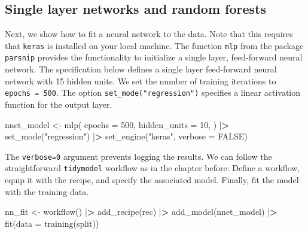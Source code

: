 \documentclass[
]{book}
\newenvironment{Shaded}{\begin{snugshade}}{\end{snugshade}}
\newcommand{\AttributeTok}[1]{\textcolor[rgb]{0.61,0.61,0.61}{#1}}
\newcommand{\ConstantTok}[1]{\textcolor[rgb]{0,0,0}{#1}}
\newcommand{\DecValTok}[1]{\textcolor[rgb]{0.06,0.06,0.06}{#1}}
\newcommand{\ErrorTok}[1]{\textcolor[rgb]{0.14,0.14,0.14}{\textbf{#1}}}
\newcommand{\FunctionTok}[1]{\textcolor[rgb]{0,0,0}{#1}}
\newcommand{\NormalTok}[1]{#1}
\newcommand{\OtherTok}[1]{\textcolor[rgb]{0.37,0.37,0.37}{#1}}
\newcommand{\SpecialCharTok}[1]{\textcolor[rgb]{0,0,0}{#1}}
\newcommand{\StringTok}[1]{\textcolor[rgb]{0.5,0.5,0.5}{#1}}
\begin{document}
\hypertarget{single-layer-networks-and-random-forests}{%
\subsection{Single layer networks and random forests}\label{single-layer-networks-and-random-forests}}

Next, we show how to fit a neural network to the data. Note that this requires that \texttt{keras} is installed on your local machine. The function \texttt{mlp} from the package \texttt{parsnip} provides the functionality to initialize a single layer, feed-forward neural network. The specification below defines a single layer feed-forward neural network with 15 hidden units. We set the number of training iterations to \texttt{epochs\ =\ 500}. The option \texttt{set\_mode("regression")} specifies a linear activation function for the output layer.

\begin{Shaded}
\begin{Highlighting}[]
\NormalTok{nnet\_model }\OtherTok{\textless{}{-}} \FunctionTok{mlp}\NormalTok{(}
  \AttributeTok{epochs =} \DecValTok{500}\NormalTok{,}
  \AttributeTok{hidden\_units =} \DecValTok{10}\NormalTok{,}
\NormalTok{) }\SpecialCharTok{|}\ErrorTok{\textgreater{}}
  \FunctionTok{set\_mode}\NormalTok{(}\StringTok{"regression"}\NormalTok{) }\SpecialCharTok{|}\ErrorTok{\textgreater{}}
  \FunctionTok{set\_engine}\NormalTok{(}\StringTok{"keras"}\NormalTok{, }\AttributeTok{verbose =} \ConstantTok{FALSE}\NormalTok{)}
\end{Highlighting}
\end{Shaded}

The \texttt{verbose=0} argument prevents logging the results. We can follow the straightforward \texttt{tidymodel} workflow as in the chapter before: Define a workflow, equip it with the recipe, and specify the associated model. Finally, fit the model with the training data.

\begin{Shaded}
\begin{Highlighting}[]
\NormalTok{nn\_fit }\OtherTok{\textless{}{-}} \FunctionTok{workflow}\NormalTok{() }\SpecialCharTok{|}\ErrorTok{\textgreater{}}
  \FunctionTok{add\_recipe}\NormalTok{(rec) }\SpecialCharTok{|}\ErrorTok{\textgreater{}}
  \FunctionTok{add\_model}\NormalTok{(nnet\_model) }\SpecialCharTok{|}\ErrorTok{\textgreater{}}
  \FunctionTok{fit}\NormalTok{(}\AttributeTok{data =} \FunctionTok{training}\NormalTok{(split))}
\end{Highlighting}
\end{Shaded}
\end{document}
